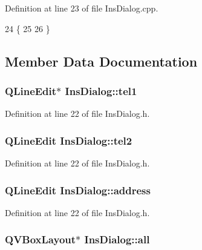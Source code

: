 Definition at line 23 of file Ins\+Dialog.\+cpp.


\begin{DoxyCode}
24 \{
25     
26 \}
\end{DoxyCode}


\subsection{Member Data Documentation}
\hypertarget{class_ins_dialog_a2edd5f0fce0dcc6f12c4f8cd391b5fc0}{
\subsubsection[{tel1}]{\setlength{\rightskip}{0pt plus 5cm}Q\+Line\+Edit$\ast$ Ins\+Dialog\+::tel1\hspace{0.3cm}{\ttfamily [private]}}}\label{class_ins_dialog_a2edd5f0fce0dcc6f12c4f8cd391b5fc0}


Definition at line 22 of file Ins\+Dialog.\+h.

\hypertarget{class_ins_dialog_a80b1bd54ec9e97020280559e6b5532db}{
\subsubsection[{tel2}]{\setlength{\rightskip}{0pt plus 5cm}Q\+Line\+Edit Ins\+Dialog\+::tel2\hspace{0.3cm}{\ttfamily [private]}}}\label{class_ins_dialog_a80b1bd54ec9e97020280559e6b5532db}


Definition at line 22 of file Ins\+Dialog.\+h.

\hypertarget{class_ins_dialog_acd23e80138ee75cc27dd87dff5457ba9}{
\subsubsection[{address}]{\setlength{\rightskip}{0pt plus 5cm}Q\+Line\+Edit Ins\+Dialog\+::address\hspace{0.3cm}{\ttfamily [private]}}}\label{class_ins_dialog_acd23e80138ee75cc27dd87dff5457ba9}


Definition at line 22 of file Ins\+Dialog.\+h.

\hypertarget{class_ins_dialog_ab8de5f3cd72b44a3b3524fc52bac148c}{
\subsubsection[{all}]{\setlength{\rightskip}{0pt plus 5cm}Q\+V\+Box\+Layout$\ast$ Ins\+Dialog\+::all\hspace{0.3cm}{\ttfamily [private]}}}\label{class_ins_dialog_ab8de5f3cd72b44a3b3524fc52bac148c}


